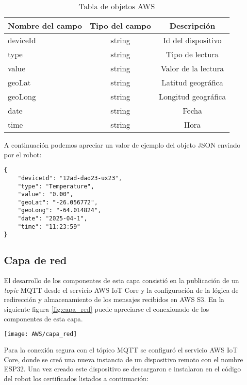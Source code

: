 \begin{table}[h]
	\centering
	\caption[caption corto]{Tabla de objetos AWS}
	\begin{tabular}{l c c}    
		\toprule
		\textbf{Nombre del campo} & \textbf{Tipo del campo} & \textbf{Descripción}  \\
		\midrule
		deviceId & string & Id del dispositivo \\		
		type & string & Tipo de lectura \\		
		value & string & Valor de la lectura \\		
		geoLat & string & Latitud geográfica \\		
		geoLong & string & Longitud geográfica\\		
		date & string & Fecha \\		
		time & string & Hora \\		
		
		\bottomrule
		\hline
	\end{tabular}
	\label{tab:json_fields}
\end{table}


A continuación podemos apreciar un valor de ejemplo del objeto JSON enviado por el robot:

\begin{lstlisting}
{   	
	"deviceId": "12ad-dao23-ux23",
	"type": "Temperature",
	"value": "0.00",
	"geoLat": "-26.056772",
	"geoLong": "-64.014824",
	"date": "2025-04-1",
	"time": "11:23:59"
}
\end{lstlisting}

\subsection{Capa de red}

El desarrollo de los componentes de esta capa consistió en la publicación de un \textit{topic} MQTT desde el servicio AWS IoT Core y la configuración de la lógica de redirección y almacenamiento de los mensajes recibidos en AWS S3. En la siguiente figura \ref{fig:capa_red} puede apreciarse el conexionado de los componentes de esta capa.


\begin{center}
   \texttt{[image: AWS/capa\_red]}
   \label{fig:capa_red}
\end{center}

Para la conexión segura con el tópico MQTT se configuró el servicio AWS IoT Core, donde se creó una nueva instancia de un dispositivo remoto con el nombre ESP32. Una vez creado este dispositivo se descargaron e instalaron en el código del robot los certificados listados a continuación:


